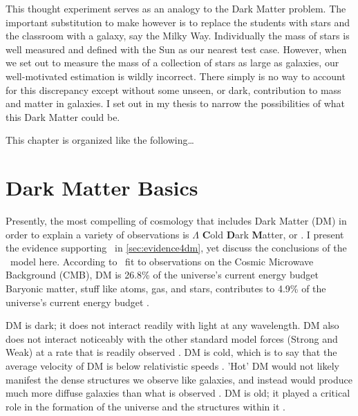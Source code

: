 This thought experiment serves as an analogy to the Dark Matter problem.
The important substitution to make however is to replace the students with stars and the classroom with a galaxy, say the Milky Way.
Individually the mass of stars is well measured and defined with the Sun as our nearest test case.
However, when we set out to measure the mass of a collection of stars as large as galaxies, our well-motivated estimation is wildly incorrect.
There simply is no way to account for this discrepancy except without some unseen, or dark, contribution to mass and matter in galaxies.
I set out in my thesis to narrow the possibilities of what this Dark Matter could be.

This chapter is organized like the following\dots
{}

\section{Dark Matter Basics\label{sec:basicDM}}

Presently, the most compelling of cosmology that includes Dark Matter (DM) in order to explain a variety of observations is $\Lambda$ \textbf{C}old \textbf{D}ark \textbf{M}atter, or \lcdm.
I present the evidence supporting \lcdm~in \ref{sec:evidence4dm}, yet discuss the conclusions of the \lcdm~model here.
According to \lcdm~fit to observations on the Cosmic Microwave Background (CMB), DM is 26.8\% of the universe's current energy budget
Baryonic matter, stuff like atoms, gas, and stars, contributes to 4.9\% of the universe's current energy budget \cite{Greene:cosmology_dm,Young:cosmology_dm,Bertone:particleDM}.


DM is dark; it does not interact readily with light at any wavelength.
DM also does not interact noticeably with the other standard model forces (Strong and Weak) at a rate that is readily observed \cite{Bertone:particleDM}.
DM is cold, which is to say that the average velocity of DM is below relativistic speeds \cite{Greene:cosmology_dm}.
'Hot' DM would not likely manifest the dense structures we observe like galaxies, and instead would produce much more diffuse galaxies than what is observed \cite{Bertone:particleDM,Greene:cosmology_dm}.
DM is old; it played a critical role in the formation of the universe and the structures within it \cite{Greene:cosmology_dm,Young:cosmology_dm}.

